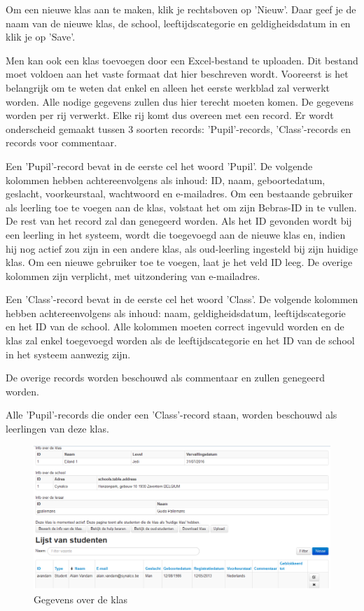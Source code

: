 \documentclass[]{article}
\begin{document}
Om een nieuwe klas aan te maken, klik je rechtsboven op 'Nieuw'. Daar geef je de naam van de nieuwe klas, de school, leeftijdscategorie en geldigheidsdatum in en klik je op 'Save'.

Men kan ook een klas toevoegen door een Excel-bestand te uploaden. Dit bestand moet voldoen aan het vaste formaat dat hier beschreven wordt. 
Vooreerst is het belangrijk om te weten dat enkel en alleen het eerste werkblad zal verwerkt worden. Alle nodige gegevens zullen dus hier terecht moeten komen. De gegevens worden per rij verwerkt. Elke rij komt dus overeen met een record. Er wordt onderscheid gemaakt tussen 3 soorten records: 'Pupil'-records, 'Class'-records en records voor commentaar.

Een 'Pupil'-record bevat in de eerste cel het woord 'Pupil'. De volgende kolommen hebben achtereenvolgens als inhoud: ID, naam, geboortedatum, geslacht, voorkeurstaal, wachtwoord en e-mailadres. Om een bestaande gebruiker als leerling toe te voegen aan de klas, volstaat het om zijn Bebras-ID in te vullen. De rest van het record zal dan genegeerd worden. Als het ID gevonden wordt bij een leerling in het systeem, wordt die toegevoegd aan de nieuwe klas en, indien hij nog actief zou zijn in een andere klas, als oud-leerling ingesteld bij zijn huidige klas.  
Om een nieuwe gebruiker toe te voegen, laat je het veld ID leeg. De overige kolommen zijn verplicht, met uitzondering van e-mailadres.

Een 'Class'-record bevat in de eerste cel het woord 'Class'. De volgende kolommen hebben achtereenvolgens als inhoud: naam, geldigheidsdatum, leeftijdscategorie en het ID van de school. Alle kolommen moeten correct ingevuld worden en de klas zal enkel toegevoegd worden als de leeftijdscategorie en het ID van de school in het systeem aanwezig zijn. 

De overige records worden beschouwd als commentaar en zullen genegeerd worden.

Alle 'Pupil'-records die onder een 'Class'-record staan, worden beschouwd als leerlingen van deze klas. 

\begin{figure}[!ht]
	\centering
	\includegraphics[width=1\textwidth]{img/classinfo}
	\caption{Gegevens over de klas}
	\label{classinfo}
\end{figure}
\end{document}
